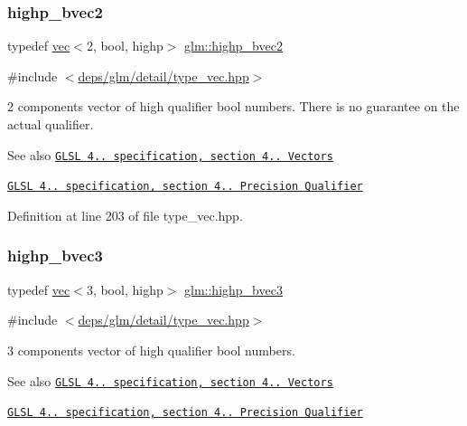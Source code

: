\subsubsection{\texorpdfstring{highp\+\_\+bvec2}{highp\_bvec2}}
{\footnotesize\ttfamily typedef \hyperlink{structglm_1_1vec}{vec}$<$2, bool, highp$>$ \hyperlink{group__core__precision_gad8f63e4c7546320f6b72808fadfda3c2}{glm\+::highp\+\_\+bvec2}}



{\ttfamily \#include $<$\hyperlink{type__vec_8hpp}{deps/glm/detail/type\+\_\+vec.\+hpp}$>$}

2 components vector of high qualifier bool numbers. There is no guarantee on the actual qualifier.

\begin{DoxySeeAlso}{See also}
\href{http://www.opengl.org/registry/doc/GLSLangSpec.4.20.8.pdf}{\tt G\+L\+SL 4.. specification, section 4.. Vectors} 

\href{http://www.opengl.org/registry/doc/GLSLangSpec.4.20.8.pdf}{\tt G\+L\+SL 4.. specification, section 4.. Precision Qualifier} 
\end{DoxySeeAlso}


Definition at line 203 of file type\+\_\+vec.\+hpp.

\mbox{\label{group__core__precision_ga0e3365e13160aa93d2a9c68529a013ce}} 
\subsubsection{\texorpdfstring{highp\+\_\+bvec3}{highp\_bvec3}}
{\footnotesize\ttfamily typedef \hyperlink{structglm_1_1vec}{vec}$<$3, bool, highp$>$ \hyperlink{group__core__precision_ga0e3365e13160aa93d2a9c68529a013ce}{glm\+::highp\+\_\+bvec3}}



{\ttfamily \#include $<$\hyperlink{type__vec_8hpp}{deps/glm/detail/type\+\_\+vec.\+hpp}$>$}

3 components vector of high qualifier bool numbers.

\begin{DoxySeeAlso}{See also}
\href{http://www.opengl.org/registry/doc/GLSLangSpec.4.20.8.pdf}{\tt G\+L\+SL 4.. specification, section 4.. Vectors} 

\href{http://www.opengl.org/registry/doc/GLSLangSpec.4.20.8.pdf}{\tt G\+L\+SL 4.. specification, section 4.. Precision Qualifier} 
\end{DoxySeeAlso}


